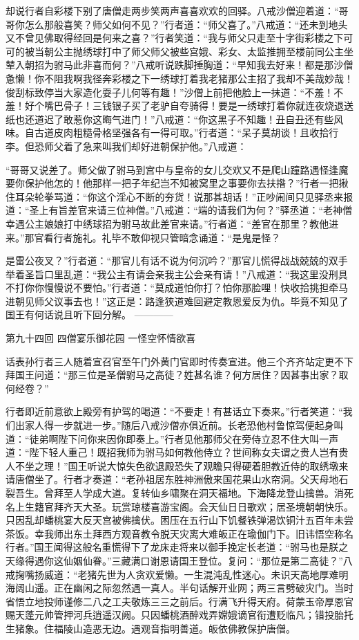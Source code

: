 \documentclass[12pt,UTF8]{ctexbook}
\begin{document}
{	却说行者自彩楼下别了唐僧走两步笑两声喜喜欢欢的回驿。八戒沙僧迎着道：“哥哥你怎么那般喜笑？师父如何不见？”行者道：“师父喜了。”八戒道：“还未到地头又不曾见佛取得经回是何来之喜？”行者笑道：“我与师父只走至十字街彩楼之下可可的被当朝公主抛绣球打中了师父师父被些宫娥、彩女、太监推拥至楼前同公主坐辇入朝招为驸马此非喜而何？”八戒听说跌脚捶胸道：“早知我去好来！都是那沙僧惫懒！你不阻我啊我径奔彩楼之下一绣球打着我老猪那公主招了我却不美哉妙哉！俊刮标致停当大家造化耍子儿何等有趣！”沙僧上前把他脸上一抹道：“不羞！不羞！好个嘴巴骨子！三钱银子买了老驴自夸骑得！要是一绣球打着你就连夜烧退送纸也还道迟了敢惹你这晦气进门！”八戒道：“你这黑子不知趣！丑自丑还有些风味。自古道皮肉粗糙骨格坚强各有一得可取。”行者道：“呆子莫胡谈！且收拾行李。但恐师父着了急来叫我们却好进朝保护他。”八戒道：
	
	“哥哥又说差了。师父做了驸马到宫中与皇帝的女儿交欢又不是爬山蹱路遇怪逢魔要你保护他怎的！他那样一把子年纪岂不知被窝里之事要你去扶揝？”行者一把揪住耳朵轮拳骂道：“你这个淫心不断的夯货！说那甚胡话！”正吵闹间只见驿丞来报道：“圣上有旨差官来请三位神僧。”八戒道：“端的请我们为何？”驿丞道：“老神僧幸遇公主娘娘打中绣球招为驸马故此差官来请。”行者道：“差官在那里？教他进来。”那官看行者施礼。礼毕不敢仰视只管暗念诵道：“是鬼是怪？
	
	是雷公夜叉？”行者道：“那官儿有话不说为何沉吟？”那官儿慌得战战兢兢的双手举着圣旨口里乱道：“我公主有请会亲我主公会亲有请！”八戒道：“我这里没刑具不打你你慢慢说不要怕。”行者道：“莫成道怕你打？怕你那脸哩！快收拾挑担牵马进朝见师父议事去也！”这正是：路逢狭道难回避定教恩爱反为仇。毕竟不知见了国王有何话说且听下回分解。
	------------
	
	第九十四回 四僧宴乐御花园 一怪空怀情欲喜
	
	话表孙行者三人随着宣召官至午门外黄门官即时传奏宣进。他三个齐齐站定更不下拜国王问道：“那三位是圣僧驸马之高徒？姓甚名谁？何方居住？因甚事出家？取何经卷？”
	
	行者即近前意欲上殿旁有护驾的喝道：“不要走！有甚话立下奏来。”行者笑道：“我们出家人得一步就进一步。”随后八戒沙僧亦俱近前。长老恐他村鲁惊驾便起身叫道：“徒弟啊陛下问你来因你即奏上。”行者见他那师父在旁侍立忍不住大叫一声道：“陛下轻人重己！既招我师为驸马如何教他侍立？世间称女夫谓之贵人岂有贵人不坐之理！”国王听说大惊失色欲退殿恐失了观瞻只得硬着胆教近侍的取绣墩来请唐僧坐了。行者才奏道：“老孙祖居东胜神洲傲来国花果山水帘洞。父天母地石裂吾生。曾拜至人学成大道。复转仙乡啸聚在洞天福地。下海降龙登山擒兽。消死名上生籍官拜齐天大圣。玩赏琼楼喜游宝阁。会天仙日日歌欢；居圣境朝朝快乐。只因乱却蟠桃宴大反天宫被佛擒伏。困压在五行山下饥餐铁弹渴饮铜汁五百年未尝茶饭。幸我师出东土拜西方观音教令脱天灾离大难皈正在瑜伽门下。旧讳悟空称名行者。”国王闻得这般名重慌得下了龙床走将来以御手挽定长老道：“驸马也是朕之天缘得遇你这仙姻仙眷。”三藏满口谢恩请国王登位。复问：“那位是第二高徒？”八戒掬嘴扬威道：“老猪先世为人贪欢爱懒。一生混沌乱性迷心。未识天高地厚难明海阔山遥。正在幽闲之际忽然遇一真人。半句话解开业网；两三言劈破灾门。当时省悟立地投师谨修二八之工夫敬炼三三之前后。行满飞升得天府。荷蒙玉帝厚恩官赐天蓬元帅管押河兵逍遥汉阙。只因蟠桃酒醉戏弄嫦娥谪官衔遭贬临凡；错投胎托生猪象。住福陵山造恶无边。遇观音指明善道。皈依佛教保护唐僧。
	
}
\end{document}
